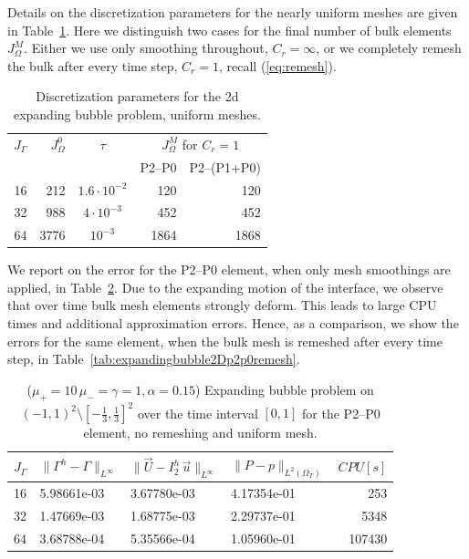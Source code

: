 \documentclass[a4paper,12pt,onecolumn]{article}
\newcommand{\errorXx}{\|\Gamma^h - \Gamma\|_{L^\infty}}
\newcommand{\errorUu}[1]{\|\vec U - I^h_{#1}\,\vec u\|_{L^\infty}}
\newcommand{\LerrorPp}{\|P - p\|_{L^2(\Omega_T)}}
\begin{document}
Details on the discretization parameters for the nearly uniform meshes are
given in Table~\ref{tab:expandingbubble2Delements}. Here we distinguish two
cases for the final number of bulk elements $J_\Omega^M$. Either we use only
smoothing throughout, $C_r = \infty$, or we completely remesh the bulk after 
every time step, $C_r = 1$, recall (\ref{eq:remesh}).
\begin{table}
\center
\begin{tabular}{rrcrr}
\hline
$J_\Gamma$ & $J_\Omega^0$ & $\tau$ & 
\multicolumn{2}{c}{$J_\Omega^M$ for $C_r=1$} \\
& & & P2--P0 & P2--(P1+P0) \\
\hline
16 &  212 & $1.6\cdot10^{-2}$ &  120 &  120 \\
32 &  988 &   $4\cdot10^{-3}$ &  452 &  452 \\
64 & 3776 &         $10^{-3}$ & 1864 & 1868 \\
\hline
\end{tabular}
\caption{Discretization parameters for the 2d expanding bubble problem, 
uniform meshes.}
\label{tab:expandingbubble2Delements}
\end{table}
We report on the error for the P2--P0 element, when only mesh smoothings are
applied, in Table~\ref{tab:expandingbubble2Dp2p0smooth}. Due to the expanding
motion of the interface, we observe that over time bulk mesh elements strongly 
deform. This leads to large CPU times and additional approximation errors.
Hence, as a comparison, we show the errors for the same element, when the bulk 
mesh is remeshed after every time step, in 
Table~\ref{tab:expandingbubble2Dp2p0remesh}.
\begin{table}
 \center
\begin{tabular}{llllr}
\hline
$J_\Gamma$ & $\errorXx$ & $\errorUu2$ & $\LerrorPp$ & $CPU[s]$\\
\hline
16 & 5.98661e-03 & 3.67780e-03 & 4.17354e-01 &    253 \\
32 & 1.47669e-03 & 1.68775e-03 & 2.29737e-01 &   5348 \\
64 & 3.68788e-04 & 5.35566e-04 & 1.05960e-01 & 107430 \\
\hline
\end{tabular}
\caption{($\mu_+ = 10\,\mu_- = \gamma = 1,\alpha = 0.15$) Expanding bubble 
problem on $(-1,1)^2\setminus[-\frac{1}{3},\frac{1}{3}]^2$ over the time 
interval $[0,1]$ for the P2--P0 element, no remeshing and uniform mesh.}
\label{tab:expandingbubble2Dp2p0smooth}
\end{table}
\end{document}
